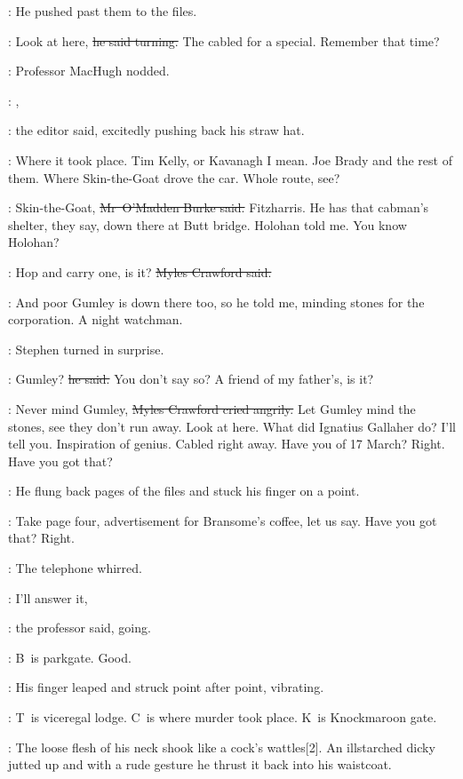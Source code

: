 :
He pushed past them to the files.

\crawford:
Look at here,
\sout{he said turning.}
The  cabled for a special.
Remember that time?

:
Professor MacHugh nodded.

\crawford:
,

:
the editor said,
excitedly pushing back his straw hat.

\crawford:
Where it took place.
Tim Kelly, or Kavanagh I mean.
Joe Brady and the rest of them.
Where Skin-the-Goat drove the car.
Whole route, see?

\omaddenburke:
Skin-the-Goat,
\sout{Mr~O'Madden Burke said.}
Fitzharris.
He has that cabman's shelter, they say,
down there at Butt bridge.
Holohan told me.
You know Holohan?

\crawford:
Hop and carry one,
is it?
\sout{Myles Crawford said.}

\omaddenburke:
And poor Gumley is down there too,
so he told me,
minding stones for the corporation.
A night watchman.

:
Stephen turned in surprise.

\Stephen:
Gumley?
\sout{he said.}
You don't say so?
A friend of my father's,
is it?

\crawford:
Never mind Gumley,
\sout{Myles Crawford cried angrily.}
Let Gumley mind the stones,
see they don't run away.
Look at here.
What did Ignatius Gallaher do?
I'll tell you.
Inspiration of genius.
Cabled right away.
Have you  of 17 March?
Right.
Have you got that?

:
He flung back pages of the files
and stuck his finger on a point.

\crawford:
Take page four,
advertisement for Bransome's coffee,
let us say.
Have you got that?
Right.

:
The telephone whirred.



\machugh:
I'll answer it,

:
the professor said,
going.

\crawford:
B~is parkgate.
Good.

:
His finger leaped and struck point after point,
vibrating.

\crawford:
T~is viceregal lodge.
C~is where murder took place.
K~is Knockmaroon gate.

:
The loose flesh of his neck shook like a cock's wattles[2].
An illstarched dicky jutted up
and with a rude gesture
he thrust it back into his waistcoat.


